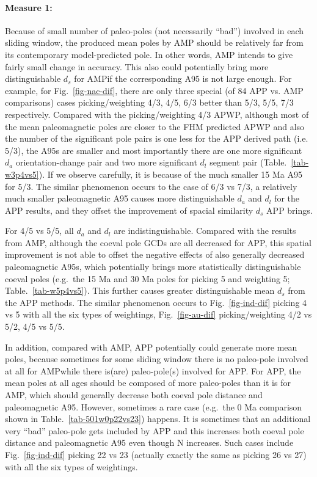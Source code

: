 \paragraph{Measure 1:}

Because of small number of paleo-poles (not necessarily ``bad'') involved in
each sliding window, the produced mean poles by AMP should be relatively far
from its contemporary model-predicted pole. In other words, AMP intends to give
fairly small change in accuracy. This also could potentially bring more
distinguishable $d_s$ for AMP\@ if the corresponding A95 is not large enough.
For example, for Fig.~\ref{fig-nac-dif}, there are only three special (of 84 APP
vs. AMP comparisons) cases picking/weighting 4/3, 4/5, 6/3 better than 5/3, 5/5,
7/3 respectively. Compared with the picking/weighting 4/3 APWP, although most of
the mean paleomagnetic poles are closer to the FHM predicted APWP and also the
number of the significant pole pairs is one less for the APP derived path (i.e.
5/3), the A95s are smaller and most importantly there are one more significant
$d_a$ orientation-change pair and two more significant $d_l$ segment pair
(Table.~\ref{tab-w3p4vs5}). If we observe carefully, it is because of the much
smaller 15 Ma A95 for 5/3. The similar phenomenon occurs to the case of 6/3 vs
7/3, a relatively much smaller paleomagnetic A95 causes more distinguishable
$d_a$ and $d_l$ for the APP results, and they offset the improvement of spacial
similarity $d_s$ APP brings.

For 4/5 vs 5/5, all $d_a$ and $d_l$ are indistinguishable. Compared with the
results from AMP, although the coeval pole GCDs are all decreased for APP, this
spatial improvement is not able to offset the negative effects of also
generally decreased paleomagnetic A95s, which potentially brings more
statistically distinguishable coeval poles (e.g.\ the 15 Ma and 30 Ma poles for
picking 5 and weighting 5; Table.~\ref{tab-w5p4vs5}). This further causes
greater distinguishable mean $d_s$ from the APP methods. The similar phenomenon
occurs to Fig.~\ref{fig-ind-dif} picking 4 vs 5 with all the six types of
weightings, Fig.~\ref{fig-au-dif} picking/weighting 4/2 vs
5/2, 4/5 vs 5/5.

In addition, compared with AMP, APP potentially could generate more mean poles,
because sometimes for some sliding window there is no paleo-pole involved at all
for AMP\@ while there is(are) paleo-pole(s) involved for APP\@. For APP, the
mean poles at all ages should be composed of more paleo-poles than it is for
AMP, which should generally decrease both coeval pole distance and paleomagnetic
A95. However, sometimes a rare case (e.g.\ the 0 Ma comparison shown in
Table.~\ref{tab-501w0p22vs23}) happens. It is sometimes that an additional
very ``bad'' paleo-pole gets included by APP and this increases both coeval pole
distance and paleomagnetic A95 even though N increases. Such cases include
Fig.~\ref{fig-ind-dif} picking 22 vs 23 (actually exactly the same as picking 26
vs 27) with all the six types of weightings.

